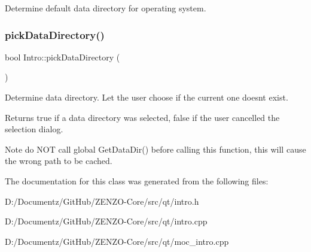 Determine default data directory for operating system. \mbox{\label{class_intro_a3e0e541cd0e55fe71484055964925cfc}} 
\subsubsection{\texorpdfstring{pickDataDirectory()}{pickDataDirectory()}}
{\footnotesize\ttfamily bool Intro\+::pick\+Data\+Directory (\begin{DoxyParamCaption}{ }\end{DoxyParamCaption})\hspace{0.3cm}{\ttfamily [static]}}

Determine data directory. Let the user choose if the current one doesn\textquotesingle{}t exist.

\begin{DoxyReturn}{Returns}
true if a data directory was selected, false if the user cancelled the selection dialog.
\end{DoxyReturn}
\begin{DoxyNote}{Note}
do N\+OT call global Get\+Data\+Dir() before calling this function, this will cause the wrong path to be cached. 
\end{DoxyNote}


The documentation for this class was generated from the following files\+:\begin{DoxyCompactItemize}
\item 
D\+:/\+Documentz/\+Git\+Hub/\+Z\+E\+N\+Z\+O-\/\+Core/src/qt/intro.\+h\item 
D\+:/\+Documentz/\+Git\+Hub/\+Z\+E\+N\+Z\+O-\/\+Core/src/qt/intro.\+cpp\item 
D\+:/\+Documentz/\+Git\+Hub/\+Z\+E\+N\+Z\+O-\/\+Core/src/qt/moc\+\_\+intro.\+cpp\end{DoxyCompactItemize}
